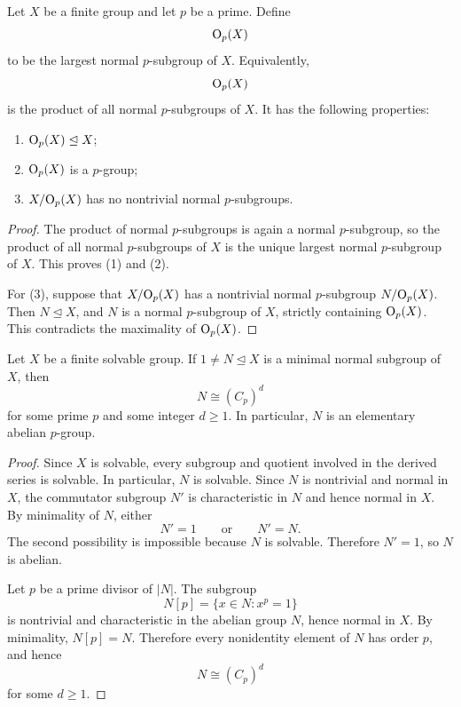 \begin{lemma}
Let \(X\) be a finite group and let \(p\) be a prime. Define
\[
    \mathrm{O}_{p}(X)
\]
to be the largest normal \(p\)-subgroup of \(X\). Equivalently,
\[
    \mathrm{O}_{p}(X)
\]
is the product of all normal \(p\)-subgroups of \(X\). It has the following
properties:
\begin{enumerate}[label=\textup{(\arabic*)}]
    \item \(\mathrm{O}_{p}(X)\trianglelefteq X\);
    \item \(\mathrm{O}_{p}(X)\) is a \(p\)-group;
    \item \(X/\mathrm{O}_{p}(X)\) has no nontrivial normal \(p\)-subgroups.
\end{enumerate}
\end{lemma}

\begin{proof}
The product of normal \(p\)-subgroups is again a normal \(p\)-subgroup, so the
product of all normal \(p\)-subgroups of \(X\) is the unique largest normal
\(p\)-subgroup of \(X\). This proves (1) and (2).

For (3), suppose that \(X/\mathrm{O}_{p}(X)\) has a nontrivial normal \(p\)-subgroup
\(N/\mathrm{O}_{p}(X)\). Then \(N\trianglelefteq X\), and \(N\) is a normal
\(p\)-subgroup of \(X\), strictly containing \(\mathrm{O}_{p}(X)\). This contradicts
the maximality of \(\mathrm{O}_{p}(X)\).
\end{proof}

\begin{lemma}
Let \(X\) be a finite solvable group. If \(1\neq N\trianglelefteq X\) is a
minimal normal subgroup of \(X\), then
\[
    N\cong (C_p)^d
\]
for some prime \(p\) and some integer \(d\geq 1\). In particular, \(N\) is an
elementary abelian \(p\)-group.
\end{lemma}

\begin{proof}
Since \(X\) is solvable, every subgroup and quotient involved in the derived
series is solvable. In particular, \(N\) is solvable. Since \(N\) is nontrivial
and normal in \(X\), the commutator subgroup \(N'\) is characteristic in \(N\)
and hence normal in \(X\). By minimality of \(N\), either
\[
    N'=1
    \qquad\text{or}\qquad
    N'=N.
\]
The second possibility is impossible because \(N\) is solvable. Therefore
\(N'=1\), so \(N\) is abelian.

Let \(p\) be a prime divisor of \(|N|\). The subgroup
\[
    N[p]=\{x\in N:x^p=1\}
\]
is nontrivial and characteristic in the abelian group \(N\), hence normal in
\(X\). By minimality, \(N[p]=N\). Therefore every nonidentity element of \(N\)
has order \(p\), and hence
\[
    N\cong (C_p)^d
\]
for some \(d\geq 1\).
\end{proof}


